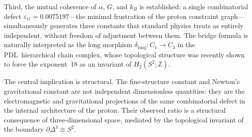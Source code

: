 \documentclass[11pt,a4paper]{article}
\theoremstyle{definition}
\newcommand{\PDL}{\textnormal{PDL}}
\newcommand{\epsg}{\varepsilon_G}
\begin{document}
Third, the mutual coherence of $\alpha$, $G$, and $k_B$ is established: a single combinatorial defect $\epsg = 0.0075197$---the minimal frustration of the proton constraint graph---simultaneously generates three constants that standard physics treats as entirely independent, without freedom of adjustment between them. The bridge formula is naturally interpreted as the long morphism $\delta_{\mathrm{long}} : C_1 \to C_3$ in the \PDL\ hierarchical chain complex, whose topological structure was recently shown to force the exponent~18 as an invariant of $H_2(S^2;\mathbb{Z})$.

The central implication is structural. The fine-structure constant and Newton's gravitational constant are not independent dimensionless quantities: they are the electromagnetic and gravitational projections of the same combinatorial defect in the internal architecture of the proton. Their observed ratio is a structural consequence of three-dimensional space, mediated by the topological invariant of the boundary $\partial\Delta^3 \cong S^2$.



\end{document}
